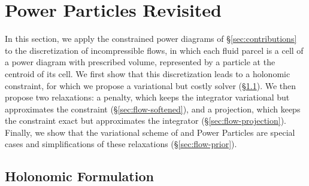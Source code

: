 \documentclass[main.tex]{subfiles}
\begin{document}

\section{Power Particles Revisited}
\label{sec:flow}

In this section, we apply the constrained power diagrams of \S\ref{sec:contributions} to the discretization of incompressible flows, in which each fluid parcel is a cell of a power diagram with prescribed volume, represented by a particle at the centroid of its cell.
We first show that this discretization leads to a holonomic constraint, for which we propose a variational but costly solver (\S\ref{sec:flow-holonomic}).
We then propose two relaxations: a penalty, which keeps the integrator variational but approximates the constraint (\S\ref{sec:flow-softened}), and a projection, which keeps the constraint exact but approximates the integrator (\S\ref{sec:flow-projection}).
Finally, we show that the variational scheme of \citet{Gallouet2018Lagrangian} and Power Particles \cite{deGoes2015PowerParticles} are special cases and simplifications of these relaxations (\S\ref{sec:flow-prior}).

\subsection{Holonomic Formulation}
\label{sec:flow-holonomic}
\end{document}
